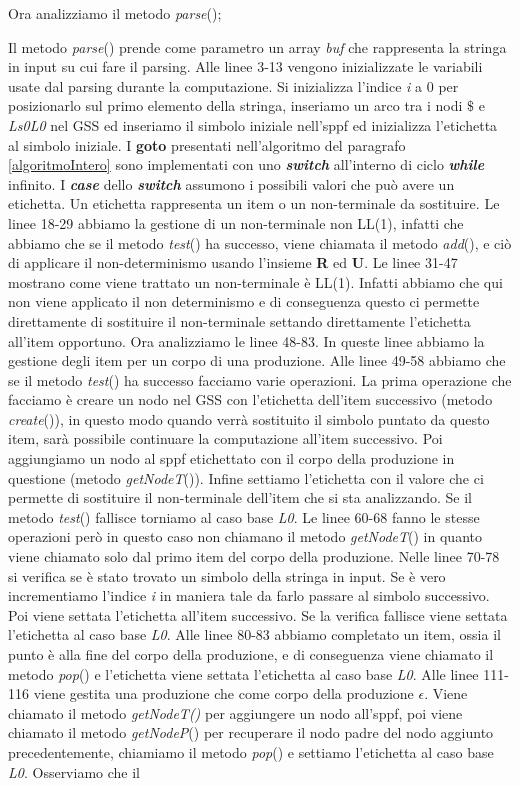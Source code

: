 Ora analizziamo il metodo \textit{parse}();

Il metodo \textit{parse}() prende come parametro un array \textit{buf} che rappresenta la stringa in input su cui fare il parsing. Alle linee 3-13 vengono inizializzate le variabili usate dal parsing durante la computazione. Si inizializza l'indice \textit{i} a 0 per posizionarlo sul primo elemento della stringa, inseriamo un arco tra i nodi $\$$ e \textit{Ls0L0} nel GSS ed inseriamo il simbolo iniziale nell'sppf ed inizializza l'etichetta al simbolo iniziale. I \textbf{goto} presentati nell'algoritmo del paragrafo \ref{algoritmoIntero} sono implementati con uno \textbf{\textit{switch }}all'interno di ciclo \textbf{\textit{while}} infinito. I \textbf{\textit{case}} dello \textbf{\textit{switch}} assumono i possibili valori che può avere un etichetta. Un etichetta rappresenta un item o un non-terminale da sostituire. Le linee 18-29 abbiamo la gestione di un non-terminale non LL(1), infatti che abbiamo che se il metodo \textit{test}() ha successo, viene chiamata il metodo \textit{add}(), e ciò di applicare il non-determinismo usando l'insieme \textbf{R} ed \textbf{U}. Le linee 31-47 mostrano come viene trattato un non-terminale è LL(1). Infatti abbiamo che qui non viene applicato il non determinismo e di conseguenza questo ci permette direttamente di sostituire il non-terminale settando direttamente l'etichetta all'item opportuno. Ora analizziamo le linee 48-83. In queste linee abbiamo la gestione degli item per un corpo di una produzione. Alle linee 49-58 abbiamo che se il metodo \textit{test}() ha successo facciamo varie operazioni. La prima operazione che facciamo è creare un nodo nel GSS con l'etichetta dell'item successivo (metodo \textit{create}()), in questo modo quando verrà sostituito il simbolo puntato da questo item, sarà possibile continuare la computazione all'item successivo. Poi aggiungiamo un nodo al sppf etichettato con il corpo della produzione in questione (metodo \textit{getNodeT}()). Infine settiamo l'etichetta con il valore che ci permette di sostituire il non-terminale dell'item che si sta analizzando. Se il metodo \textit{test}() fallisce torniamo al caso base \textit{L0}. Le linee 60-68 fanno le stesse operazioni però in questo caso non chiamano il metodo \textit{getNodeT}() in quanto viene chiamato solo dal primo item del corpo della produzione. Nelle linee 70-78 si verifica se è stato trovato un simbolo della stringa in input. Se è vero incrementiamo l'indice \textit{i} in maniera tale da farlo passare al simbolo successivo. Poi viene settata l'etichetta all'item successivo. Se la verifica fallisce viene settata l'etichetta al caso base \textit{L0}. Alle linee 80-83 abbiamo completato un item, ossia il punto è alla fine del corpo della produzione, e di conseguenza viene chiamato il metodo \textit{pop}() e l'etichetta viene settata l'etichetta al caso base \textit{L0}. Alle linee 111-116 viene gestita una produzione che come corpo della produzione $\epsilon$. Viene chiamato il metodo \textit{getNodeT()} per aggiungere un nodo all'sppf, poi viene chiamato il metodo \textit{getNodeP}() per recuperare il nodo padre del nodo aggiunto precedentemente, chiamiamo il metodo \textit{pop}() e settiamo l'etichetta al caso base \textit{L0}. Osserviamo che il 